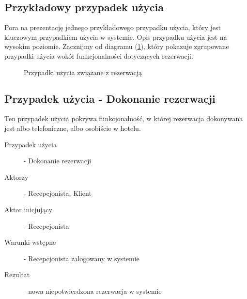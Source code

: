 \documentclass[a4paper,onecolumn,oneside,11pt,wide,floatssmall]{mwrep}
\theoremstyle{definition}
\theoremstyle{plain}%
\theoremstyle{remark}
\begin{document}
\subsection{Przykładowy przypadek użycia}
Pora na prezentację jednego przykładowego przypadku użycia, który jest kluczowym przypadkiem użycia w systemie. Opis przypadku użycia jest na wysokim poziomie. Zacznijmy od diagramu (\ref{fig:uc-rezerwacja}), który pokazuje zgrupowane przypadki użycia wokół funkcjonalności dotyczących rezerwacji.

\begin{figure}[H]
  \begin{center}
  \end{center}
  \caption{Przypadki użycia związane z rezerwacją}
  \label{fig:uc-rezerwacja}
\end{figure}

\subsection{Przypadek użycia - Dokonanie rezerwacji}
Ten przypadek użycia pokrywa funkcjonalność, w której rezerwacja dokonywana jest albo telefoniczne, albo osobiście w hotelu.
\begin{description}
  \item [Przypadek użycia] - Dokonanie rezerwacji
  \item [Aktorzy] - Recepcjonista, Klient
  \item [Aktor inicjujący] - Recepcjonista
  \item [Warunki wstępne] - Recepcjonista zalogowany w systemie
  \item [Rezultat] - nowa niepotwierdzona rezerwacja w systemie
\end{description}
\end{document}
